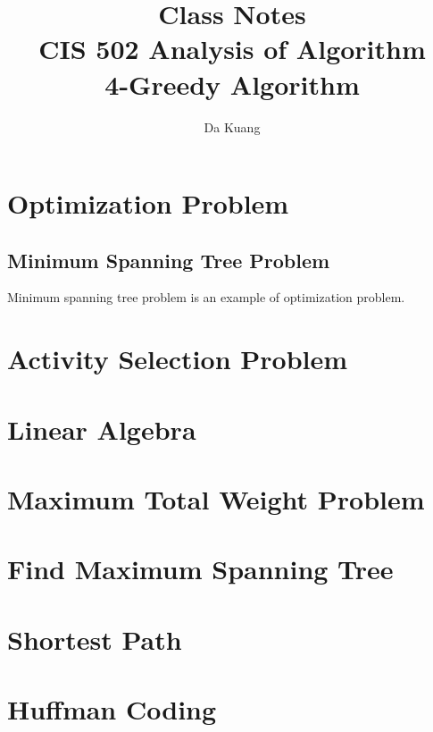 \documentclass[en,hazy,blue,screen,14pt]{elegantnote}
\title{Class Notes\\CIS 502 Analysis of Algorithm\\4-Greedy Algorithm}
\author{Da Kuang}
\institute{University of Pennsylvania}
\date{}
\begin{document}
	
\maketitle
\newpage

\section{Optimization Problem}

\subsection{Minimum Spanning Tree Problem}
Minimum spanning tree problem is an example of optimization problem.


\section{Activity Selection Problem}


\section{Linear Algebra}


\section{Maximum Total Weight Problem}

\section{Find Maximum Spanning Tree}

\section{Shortest Path}

\section{Huffman Coding}

\end{document}

